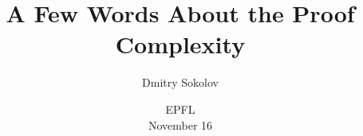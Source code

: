 

\titlegraphic{
    
}


\title[Proof Complexity]{
    A Few Words About the Proof Complexity
}

\author{
    Dmitry Sokolov
}  


\date{EPFL\\ November 16}

\newcommand{\SPCR}{\PrSys{S}\text{-}\PrSys{PCR}}
\newcommand{\SSOS}{\PrSys{S}\text{-}\PrSys{SOS}}




    \maketitle

    
%    
%    
%    
    

